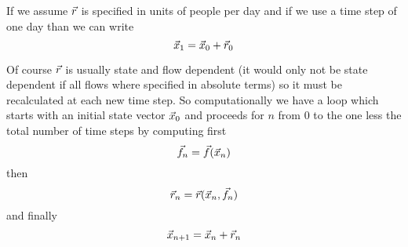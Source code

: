 If we assume $\vec{r}$ is specified in units of people per day and if we use a time step of one day than we can write
\[
    \vec{x}_1 = \vec{x}_0 + \vec{r}_0
\]

Of course $\vec{r}$ is usually state and flow dependent (it would only not be state dependent if all flows where specified in absolute terms) so it must be recalculated at each new time step. So computationally we have a loop which starts with an initial state vector $\vec{x}_0$ and proceeds for $n$ from 0 to the one less the total number of time steps by computing first
\[
    \vec{f}_n = \vec{f}(\vec{x}_n)
\]
then
\begin{equation}\label{FlowEquation}
    \vec{r}_n = \vec{r}(\vec{x}_n, \vec{f}_n)
\end{equation}
and finally
\[
    \vec{x}_{n+1} = \vec{x}_n + \vec{r}_n
\]

